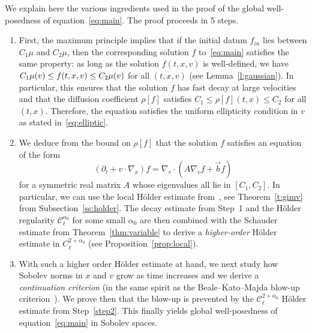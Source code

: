 \documentclass[10pt]{amsart}
\theoremstyle{definition}\newtheorem{defi}[theo]{Definition}\newtheorem{rema}[theo]{Remark}\newtheorem{exam}[theo]{Example}\newtheorem{exem}[theo]{Example}\newtheorem{nota}[theo]{Notation}
\newcommand{\cC}{\mathcal{C}}
\begin{document}
We explain here the various ingredients used in the proof of the global well-posedness of equation~\eqref{eq:main}. The proof proceeds in 5 steps.
\begin{enumerate}
\item \label{1.4.1} First, the maximum principle implies that if the initial datum $f_{in}$ lies between $C_1 \mu$ and $C_2 \mu$, then the corresponding solution $f$ to~\eqref{eq:main} satisfies the same property: as long as the solution $f(t,x,v)$ is well-defined, we have $C_1 \mu (v) \linebreak\le f(t,x,v) \le C_2 \mu (v)$ for all $(t,x,v)$ (see Lemma~\ref{l:gaussian}). In particular, this ensures that the solution $f$ has fast decay at large velocities and that the diffusion coefficient $\rho [f]$ satisfies $C_1 \le \rho [f](t,x) \le C_2$ for all $(t,x)$. Therefore, the equation satisfies the uniform ellipticity condition in $v$ as stated in~\eqref{eq:elliptic}.
\item \label{1.4.2} We deduce from the bound on $\rho [f]$ that the solution $f$ satisfies an equation of the form
\[
(\partial_t + v \cdot \nabla_x) f = \nabla_v \cdot (A \nabla_v f+
\vec b f)
\]
for a symmetric real matrix $A$ whose eigenvalues all lie in $[C_1,C_2]$. In particular, we can use the local H\"older estimate from~\cite{gimv,wz09}, see Theorem~\ref{t:gimv} from Subsection~\ref{ss:holder}. The decay estimate from Step~1 and the H\"older regularity $\cC_\ell^{\alpha_0}$ for some small $\alpha_0$ are then combined with the Schauder estimate from Theorem~\ref{thm:variable} to derive a \emph{higher-order} H\"older estimate in $C^{2+\alpha_0}_\ell$ (see Proposition~\ref{prop:local}).
\item \label{1.4.3} With such a higher order H\"older estimate at hand, we next study how Sobolev norms in $x$ and $v$ grow as time increases and we derive a \emph{continuation criterion} (in the same spirit as the Beale--Kato--Majda blow-up criterion~\cite{MR763762}). We prove then that the blow-up is prevented by the $\cC_\ell^{2+\alpha_0}$ H\"older estimate from Step~\ref{step2}. This finally yields global well-posedness of equation~\eqref{eq:main} in Sobolev spaces.
\end{enumerate}
\end{document}
